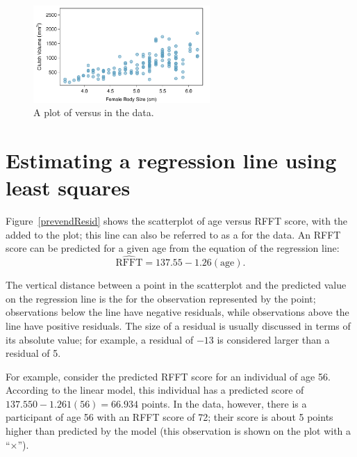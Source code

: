 \begin{figure}[h]
	\centering
	\includegraphics[width=0.6\textwidth]
	{ch_intro_to_data_oi_biostat/figures/frogClutchVolBodySize/frogClutchVolBodySize}
	\caption{A plot of  versus  in the  data.}
	\label{frogClutchVolBodySizeRegress}
\end{figure}

\section[Estimating a regression line using least squares]{\hspace{-1.5mm}Estimating a regression line using least squares}
\label{estimatingLeastSquaresLine}



Figure~\ref{prevendResid} shows the scatterplot of age versus RFFT score, with the  added to the plot; this line can also be referred to as a  for the data. An RFFT score can be predicted for a given age from the equation of the regression line:
\[\widehat{\text{RFFT}} = 137.55 - 1.26(\text{age}). \]


The vertical distance between a point in the scatterplot and the predicted value on the regression line is the  for the observation represented by the point; observations below the line have negative residuals, while observations above the line have positive residuals. The size of a residual is usually discussed in terms of its absolute value; for example, a residual of $-13$ is considered larger than a residual of 5.

For example, consider the predicted RFFT score for an individual of age 56. According to the linear model, this individual has a predicted score of $137.550 - 1.261(56) = 66.934$ points. In the data, however, there is a participant of age 56 with an RFFT score of 72; their score is about 5 points higher than predicted by the model (this observation is shown on the plot with a ``$\times$'').

